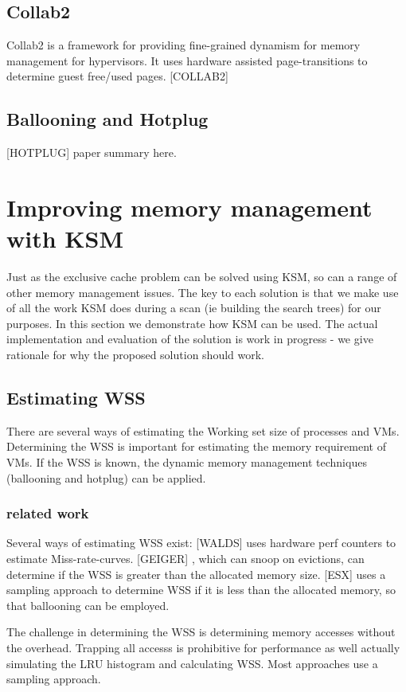 \documentclass[10pt,a4paper]{article}
\begin{document}
\subsection{Collab2}
Collab2 is a framework for providing fine-grained dynamism for memory management for hypervisors. It uses hardware assisted page-transitions to determine guest free/used pages. 
[COLLAB2]
\subsection{Ballooning and Hotplug}
[HOTPLUG] paper summary here. 

\section{Improving memory management with KSM}
Just as the exclusive cache problem can be solved using KSM, so can a range of other memory management issues. The key to each solution is that we make use of all the work KSM does during a scan (ie building the search trees) for our purposes.
In this section we demonstrate how KSM can be used. The actual implementation and evaluation of the solution is work in progress - we give rationale for why the proposed solution should work.

\subsection{Estimating WSS}
There are several ways of estimating the Working set size of processes and VMs. Determining the WSS is important for estimating the memory requirement of VMs. If the WSS is known, the dynamic memory management techniques (ballooning and hotplug) can be applied. 

\subsubsection{related work}
Several ways of estimating WSS exist: [WALDS] uses hardware perf counters to estimate Miss-rate-curves. [GEIGER] , which can snoop on evictions, can determine if the WSS is greater than the allocated memory size. [ESX] uses a sampling approach to determine WSS if it is less than the allocated memory, so that ballooning can be employed. 

The challenge in determining the WSS is determining memory accesses without the overhead. Trapping all accesss is prohibitive for performance as well actually simulating the LRU histogram and calculating WSS. Most approaches use a sampling approach. 
\end{document}
